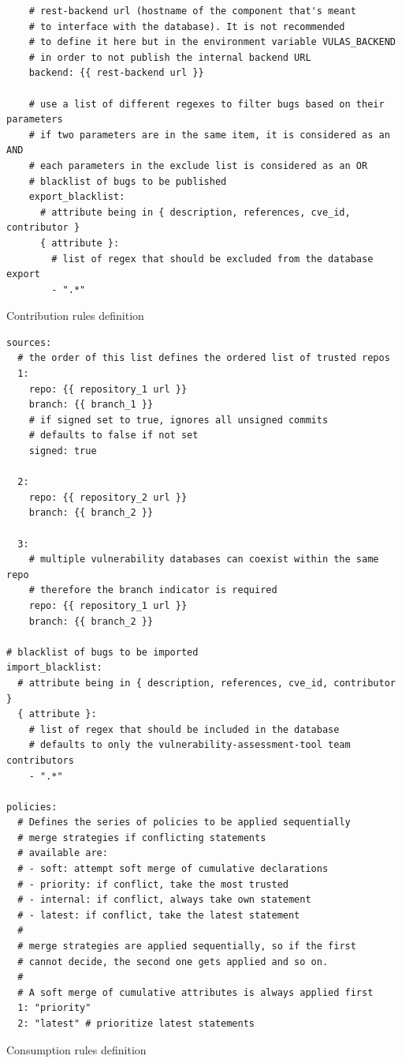\documentclass[11pt]{article}
\begin{document}
\begin{listing}[H]
    \begin{verbatim}
    # rest-backend url (hostname of the component that's meant
    # to interface with the database). It is not recommended
    # to define it here but in the environment variable VULAS_BACKEND
    # in order to not publish the internal backend URL
    backend: {{ rest-backend url }}
    
    # use a list of different regexes to filter bugs based on their parameters
    # if two parameters are in the same item, it is considered as an AND
    # each parameters in the exclude list is considered as an OR
    # blacklist of bugs to be published
    export_blacklist:
      # attribute being in { description, references, cve_id, contributor }
      { attribute }:
        # list of regex that should be excluded from the database export
        - ".*"
    \end{verbatim}
    \caption{Contribution rules definition}
    \label{list:contrib}
    \end{listing}
    
    
\begin{listing}[H]
\begin{verbatim}
sources:
  # the order of this list defines the ordered list of trusted repos
  1: 
    repo: {{ repository_1 url }}
    branch: {{ branch_1 }}
    # if signed set to true, ignores all unsigned commits
    # defaults to false if not set
    signed: true
 
  2:    
    repo: {{ repository_2 url }}
    branch: {{ branch_2 }}

  3: 
    # multiple vulnerability databases can coexist within the same repo
    # therefore the branch indicator is required
    repo: {{ repository_1 url }}
    branch: {{ branch_2 }}

# blacklist of bugs to be imported
import_blacklist:
  # attribute being in { description, references, cve_id, contributor }
  { attribute }:
    # list of regex that should be included in the database
    # defaults to only the vulnerability-assessment-tool team contributors
    - ".*"

policies:
  # Defines the series of policies to be applied sequentially
  # merge strategies if conflicting statements
  # available are:
  # - soft: attempt soft merge of cumulative declarations
  # - priority: if conflict, take the most trusted
  # - internal: if conflict, always take own statement
  # - latest: if conflict, take the latest statement
  #
  # merge strategies are applied sequentially, so if the first
  # cannot decide, the second one gets applied and so on.
  #
  # A soft merge of cumulative attributes is always applied first
  1: "priority"
  2: "latest" # prioritize latest statements
\end{verbatim}
\caption{Consumption rules definition}
\label{list:consumption}
\end{listing}
\end{document}

